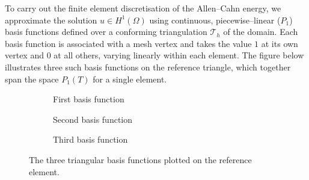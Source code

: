 \noindent To carry out the finite element discretisation of the Allen–Cahn energy, we approximate the solution $u \in H^{1}(\Omega)$ using continuous, piecewise–linear ($P_{1}$) basis functions defined over a conforming triangulation $\mathcal{T}_{h}$ of the domain. Each basis function is associated with a mesh vertex and takes the value $1$ at its own vertex and $0$ at all others, varying linearly within each element. The figure below illustrates three such basis functions on the reference triangle, which together span the space $P_{1}(T)$ for a single element.

\begin{figure}[ht]
    \centering
    \begin{subfigure}{0.32\textwidth}
        \centering
        \caption{First basis function}
        \label{fig:red}
    \end{subfigure}
    \begin{subfigure}{0.32\textwidth}
        \centering
        \caption{Second basis function}
        \label{fig:green}
    \end{subfigure}
    \begin{subfigure}{0.32\textwidth}
        \centering
        \caption{Third basis function}
        \label{fig:blue}
    \end{subfigure}
    \caption{The three triangular basis functions plotted on the reference element.}
    \label{fig:three-basis}
\end{figure}

